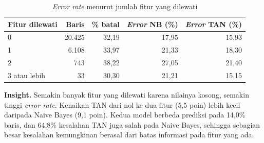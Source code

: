 \begin{table}[H]
	\centering
	\caption{\textit{Error rate} menurut jumlah fitur yang dilewati}
	\label{tab:nb-error-kosong}
	\begin{tabular}{l r r r r}
		\toprule
		\textbf{Fitur dilewati} & \textbf{Baris} & \textbf{\% batal} & \textbf{\textit{Error} NB (\%)} & \textbf{\textit{Error} TAN (\%)} \\
		\midrule
		0 & 20.425 & 32,19 & 17,95 & 15,93 \\
		1 & 6.108 & 33,97 & 21,33 & 18,30 \\
		2 & 743 & 38,22 & 27,05 & 21,40 \\
		3 atau lebih & 33 & 30,30 & 21,21 & 15,15 \\
		\bottomrule
	\end{tabular}
\end{table}

{\small
\textbf{Insight.} Semakin banyak fitur yang dilewati karena nilainya kosong, semakin tinggi \textit{error rate}. Kenaikan TAN dari nol ke dua fitur (5,5 poin) lebih kecil daripada Naive Bayes (9,1 poin). Kedua model berbeda prediksi pada 14,0\% baris, dan 64,8\% kesalahan TAN juga salah pada Naive Bayes, sehingga sebagian besar kesalahan kemungkinan berasal dari batas informasi pada fitur yang ada.\par}
